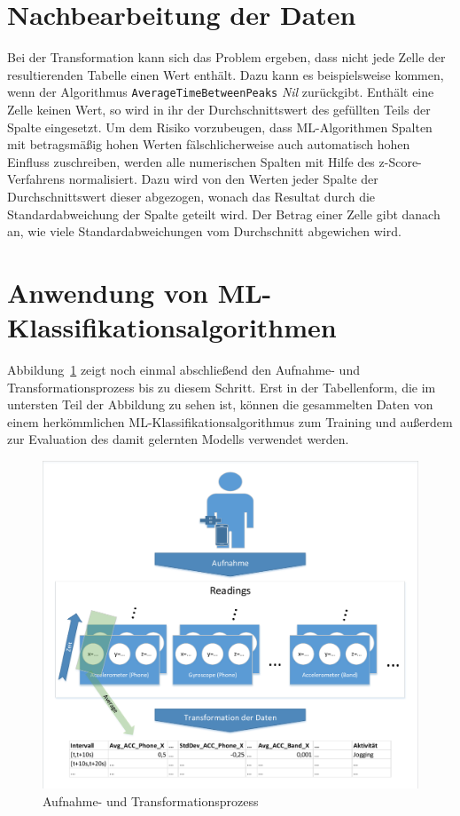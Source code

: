 \section{Nachbearbeitung der Daten}
Bei der Transformation kann sich das Problem ergeben, dass nicht jede Zelle der resultierenden Tabelle einen Wert enthält. Dazu kann es beispielsweise kommen, wenn der Algorithmus \texttt{AverageTimeBetweenPeaks} \textit{Nil} zurückgibt. Enthält eine Zelle keinen Wert, so wird in ihr der Durchschnittswert des gefüllten Teils der Spalte eingesetzt. Um dem Risiko vorzubeugen, dass ML-Algorithmen Spalten mit betragsmäßig hohen Werten fälschlicherweise auch automatisch hohen Einfluss zuschreiben, werden alle numerischen Spalten mit Hilfe des z-Score-Verfahrens normalisiert. Dazu wird von den Werten jeder Spalte der Durchschnittswert dieser abgezogen, wonach das Resultat durch die Standardabweichung der Spalte geteilt wird. Der Betrag einer Zelle gibt danach an, wie viele Standardabweichungen vom Durchschnitt abgewichen wird.

\section{Anwendung von ML-Klassifikationsalgorithmen}
\label{section:ml-algos}

Abbildung~\ref{fig:recording-and-transformation} zeigt noch einmal abschließend den Aufnahme- und Transformationsprozess bis zu diesem Schritt. Erst in der Tabellenform, die im untersten Teil der Abbildung zu sehen ist, können die gesammelten Daten von einem herkömmlichen ML-Klassifikationsalgorithmus zum Training und außerdem zur Evaluation des damit gelernten Modells verwendet werden.

\begin{figure}[h]
	\centering
	\includegraphics[width=\textwidth,clip,trim=5mm 5mm 5mm 5mm]{img/transformation}
	\caption{Aufnahme- und Transformationsprozess}
	\label{fig:recording-and-transformation}
\end{figure}

